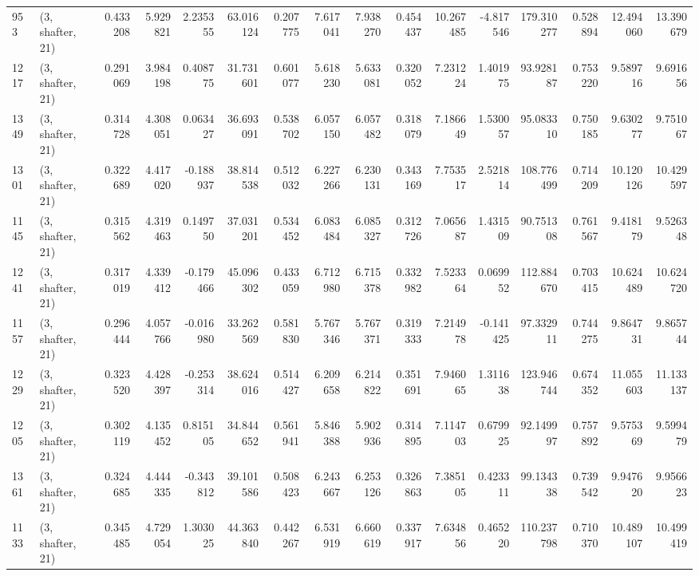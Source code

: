 \begin{tabular}{llrrrrrrrrrrrrrr}
953  &  (3, shafter, 21) &   0.433208 &   5.929821 &   2.235355 &     63.016124 &    0.207775 &    7.617041 &    7.938270 &  0.454437 &  10.267485 &  -4.817546 &   179.310277 &   0.528894 &  12.494060 &  13.390679 \\
1217 &  (3, shafter, 21) &   0.291069 &   3.984198 &   0.408775 &     31.731601 &    0.601077 &    5.618230 &    5.633081 &  0.320052 &   7.231224 &   1.401975 &    93.928187 &   0.753220 &   9.589716 &   9.691656 \\
1349 &  (3, shafter, 21) &   0.314728 &   4.308051 &   0.063427 &     36.693091 &    0.538702 &    6.057150 &    6.057482 &  0.318079 &   7.186649 &   1.530057 &    95.083310 &   0.750185 &   9.630277 &   9.751067 \\
1301 &  (3, shafter, 21) &   0.322689 &   4.417020 &  -0.188937 &     38.814538 &    0.512032 &    6.227266 &    6.230131 &  0.343169 &   7.753517 &   2.521814 &   108.776499 &   0.714209 &  10.120126 &  10.429597 \\
1145 &  (3, shafter, 21) &   0.315562 &   4.319463 &   0.149750 &     37.031201 &    0.534452 &    6.083484 &    6.085327 &  0.312726 &   7.065687 &   1.431509 &    90.751308 &   0.761567 &   9.418179 &   9.526348 \\
1241 &  (3, shafter, 21) &   0.317019 &   4.339412 &  -0.179466 &     45.096302 &    0.433059 &    6.712980 &    6.715378 &  0.332982 &   7.523364 &   0.069952 &   112.884670 &   0.703415 &  10.624489 &  10.624720 \\
1157 &  (3, shafter, 21) &   0.296444 &   4.057766 &  -0.016980 &     33.262569 &    0.581830 &    5.767346 &    5.767371 &  0.319333 &   7.214978 &  -0.141425 &    97.332911 &   0.744275 &   9.864731 &   9.865744 \\
1229 &  (3, shafter, 21) &   0.323520 &   4.428397 &  -0.253314 &     38.624016 &    0.514427 &    6.209658 &    6.214822 &  0.351691 &   7.946065 &   1.311638 &   123.946744 &   0.674352 &  11.055603 &  11.133137 \\
1205 &  (3, shafter, 21) &   0.302119 &   4.135452 &   0.815105 &     34.844652 &    0.561941 &    5.846388 &    5.902936 &  0.314895 &   7.114703 &   0.679925 &    92.149997 &   0.757892 &   9.575369 &   9.599479 \\
1361 &  (3, shafter, 21) &   0.324685 &   4.444335 &  -0.343812 &     39.101586 &    0.508423 &    6.243667 &    6.253126 &  0.326863 &   7.385105 &   0.423311 &    99.134338 &   0.739542 &   9.947620 &   9.956623 \\
1133 &  (3, shafter, 21) &   0.345485 &   4.729054 &   1.303025 &     44.363840 &    0.442267 &    6.531919 &    6.660619 &  0.337917 &   7.634856 &   0.465220 &   110.237798 &   0.710370 &  10.489107 &  10.499419 \\

\end{tabular}
